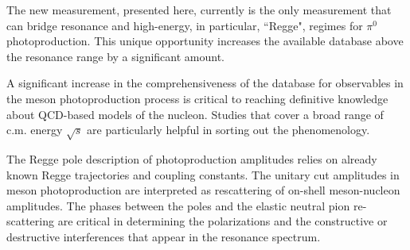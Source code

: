 \documentclass[aps,prc,twocolumn,floatfix,showpacs,preprintnumbers,amsmath,amssymb,superscriptaddress]{revtex4-1}
\begin{document}

The new measurement, presented here, currently is the only measurement that can bridge resonance and 
high-energy, in particular, ``Regge", regimes for $\pi^0$ photoproduction. This unique opportunity increases the
available database above the resonance range by a significant amount.

A significant increase in the 
comprehensiveness of the database for observables in the meson 
photoproduction process is critical to reaching definitive 
knowledge about QCD-based models of the nucleon. Studies that 
cover a broad range of c.m. energy $\sqrt{s}$ are particularly 
helpful in sorting out the phenomenology.


The Regge pole description of photoproduction amplitudes relies on 
already known Regge 
trajectories and coupling constants. The unitary cut amplitudes in meson
photoproduction are interpreted as rescattering of on-shell meson-nucleon amplitudes.  
The phases between the poles and the elastic neutral 
pion re-scattering 
are critical in determining the polarizations and the constructive or destructive interferences that appear in the resonance spectrum.
\end{document}

